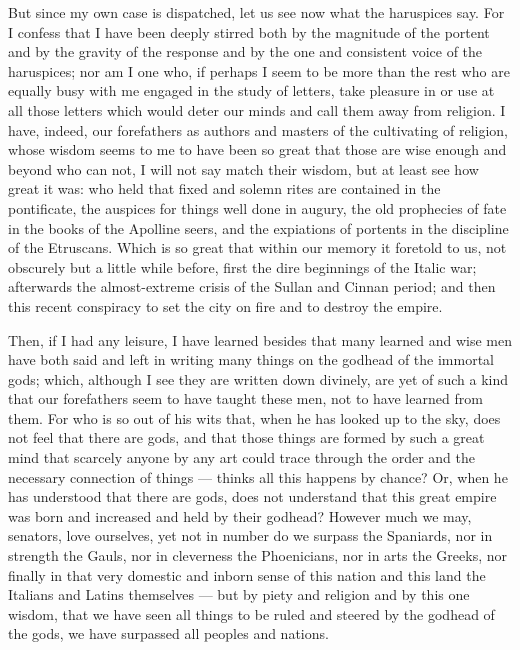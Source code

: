  But since my own case is dispatched, let us see now what the haruspices say. For I confess that I have been deeply stirred both by the magnitude of the portent and by the gravity of the response and by the one and consistent voice of the haruspices; nor am I one who, if perhaps I seem to be more than the rest who are equally busy with me engaged in the study of letters, take pleasure in or use at all those letters which would deter our minds and call them away from religion. I have, indeed, our forefathers as authors and masters of the cultivating of religion, whose wisdom seems to me to have been so great that those are wise enough and beyond who can not, I will not say match their wisdom, but at least see how great it was: who held that fixed and solemn rites are contained in the pontificate, the auspices for things well done in augury, the old prophecies of fate in the books of the Apolline seers, and the expiations of portents in the discipline of the Etruscans. Which is so great that within our memory it foretold to us, not obscurely but a little while before, first the dire beginnings of the Italic war; afterwards the almost-extreme crisis of the Sullan and Cinnan period; and then this recent conspiracy to set the city on fire and to destroy the empire.

 Then, if I had any leisure, I have learned besides that many learned and wise men have both said and left in writing many things on the godhead of the immortal gods; which, although I see they are written down divinely, are yet of such a kind that our forefathers seem to have taught these men, not to have learned from them. For who is so out of his wits that, when he has looked up to the sky, does not feel that there are gods, and that those things are formed by such a great mind that scarcely anyone by any art could trace through the order and the necessary connection of things --- thinks all this happens by chance? Or, when he has understood that there are gods, does not understand that this great empire was born and increased and held by their godhead? However much we may, senators, love ourselves, yet not in number do we surpass the Spaniards, nor in strength the Gauls, nor in cleverness the Phoenicians, nor in arts the Greeks, nor finally in that very domestic and inborn sense of this nation and this land the Italians and Latins themselves --- but by piety and religion and by this one wisdom, that we have seen all things to be ruled and steered by the godhead of the gods, we have surpassed all peoples and nations.

